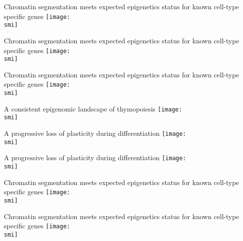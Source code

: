\documentclass[10pt]{beamer}
\def\smi{out/ln/updir/mw-gcthesis-oral/library.bib}
\begin{document}
\begin{frame}{Chromatin segmentation meets expected epigenetics status for known cell-type specific genes} 
  \def\smi{out/ln/updir/mw-gcthesis-oral/ink/chromatin-states/genome-view/hematopoiesis/hsc-t-markers.pdf}
  \texttt{[image: \\smi]}
\end{frame}
\begin{frame}{Chromatin segmentation meets expected epigenetics status for known cell-type specific genes} 
  \def\smi{out/ln/updir/mw-gcthesis-oral/ink/chromatin-states/genome-view/hematopoiesis/b-marker.pdf}
  \texttt{[image: \\smi]}
\end{frame}
\begin{frame}{Chromatin segmentation meets expected epigenetics status for known cell-type specific genes} 
  \def\smi{out/ln/updir/mw-gcthesis-oral/ink/chromatin-states/genome-view/hematopoiesis/b-myeloid-markers.pdf}
  \texttt{[image: \\smi]}
\end{frame}
\begin{frame}{A consistent epigenomic landscape of thymopoiesis}
  \def\smi{out/ln/updir/mw-gcthesis-oral/ink/chromatin-states/both-mca.pdf}
  \texttt{[image: \\smi]}
\end{frame}
\begin{frame}{A progressive loss of plasticity during differentiation}
  \def\smi{out/ln/updir/mw-gcthesis-oral/ink/chromatin-states/riverplot-model.pdf}
  \texttt{[image: \\smi]}
\end{frame}
\begin{frame}{A progressive loss of plasticity during differentiation}
  \def\smi{out/ln/updir/mw-gcthesis-oral/ink/chromatin-states/riverplot-heatmap.pdf}
  \texttt{[image: \\smi]}
\end{frame}
\begin{frame}{Chromatin segmentation meets expected epigenetics status for known cell-type specific genes}
  \def\smi{out/ln/updir/mw-gcthesis-oral/ink/chromatin-states/genome-view/t-lineage/1.pdf}
  \texttt{[image: \\smi]}
\end{frame}
\begin{frame}{Chromatin segmentation meets expected epigenetics status for known cell-type specific genes}
  \def\smi{out/ln/updir/mw-gcthesis-oral/ink/chromatin-states/genome-view/t-lineage/2.pdf}
  \texttt{[image: \\smi]}
\end{frame}
\end{document}
